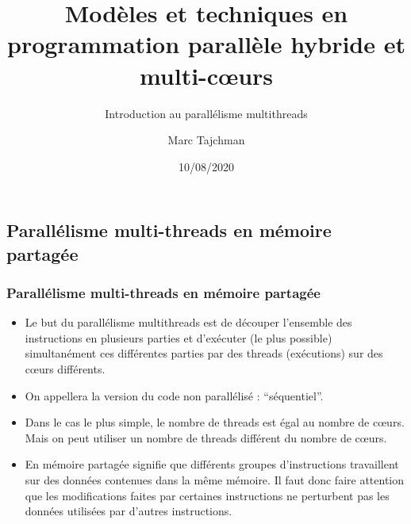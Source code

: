 \documentclass{beamer}
\title{Modèles et techniques en programmation parallèle hybride et multi-c\oe urs}
\subtitle{Introduction au parall\'elisme multithreads}
\author{Marc Tajchman}\institute{CEA - DEN/DM2S/STMF/LMES}
\date{10/08/2020}
\begin{document}
\begin{frame}
	\titlepage
\end{frame}

\large
\begin{frame}
	\section{Parallélisme multi-threads en mémoire partagée}
	\frametitle{Parallélisme multi-threads en mémoire partagée}

\begin{itemize}
	\item 
	Le but du parallélisme multithreads est de découper l'ensemble des instructions en plusieurs parties et d'exécuter (le plus possible) simultanément ces différentes parties par des threads (exécutions) sur des c\oe urs différents.
	\item 
	On appellera la version du code non parallélisé : ``séquentiel''.
	\item 
    Dans le cas le plus simple, le nombre de threads est égal au nombre de c\oe urs. Mais on peut utiliser un nombre de threads différent du nombre de c\oe urs.
	\item 
	En mémoire partagée signifie que différents groupes d'instructions travaillent sur des données contenues dans la même mémoire. Il faut donc faire attention que les modifications faites par certaines instructions ne perturbent pas les données utilisées par d'autres instructions.
\end{itemize}
\end{frame}
\end{document}
